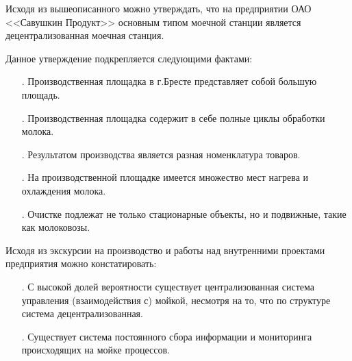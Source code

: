 {\gostFont

  \par \redline Исходя из вышеописанного можно утверждать, что на предприятии ОАО <<Савушкин Продукт>> основным типом моечной станции является децентрализованная моечная станция.
  
  \par \redline Данное утверждение подкрепляется следующими фактами: 
  
  \begin{itemize}[leftmargin=2.15cm, labelwidth=0.65cm, labelsep=0.0cm] 
  	
  	\item[\theitemcntr. ] Производственная площадка в г.Бресте представляет собой большую площадь.
  	\addtocounter{itemcntr}{1}
  	
  	\item[\theitemcntr. ] Производственная площадка содержит в себе полные циклы обработки молока.
  	\addtocounter{itemcntr}{1}
  	
  	\item[\theitemcntr. ] Результатом производства является разная номенклатура товаров.
  	\addtocounter{itemcntr}{1}
  	
  	\item[\theitemcntr. ] На производственной площадке имеется множество мест нагрева и охлаждения молока.
  	\addtocounter{itemcntr}{1}
  	
  	\item[\theitemcntr. ] Очистке подлежат не только стационарные объекты, но и подвижные, такие как молоковозы.
  	\addtocounter{itemcntr}{1}
  	
  	\setcounter{itemcntr}{1}
  \end{itemize}
  
  \par \redline Исходя из экскурсии на производство и работы над внутренними проектами предприятия можно констатировать:
  
  \begin{itemize}[leftmargin=2.15cm, labelwidth=0.65cm, labelsep=0.0cm] 
  	
  	\item[\theitemcntr. ] С высокой долей вероятности существует централизованная система управления (взаимодействия с) мойкой, несмотря на то, что по структуре система децентрализованная.
  	\addtocounter{itemcntr}{1}
  	
  	\item[\theitemcntr. ] Существует система постоянного сбора информации и мониторинга происходящих на мойке процессов.
  	\addtocounter{itemcntr}{1}
  	

\end{itemize}}
